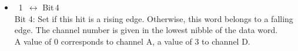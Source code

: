 \begin{description}[style=nextline]
{\begin{itemize}
\begin{align*}
                &\times \texttt{xtdc4\_param\_info.binsize}
            \end{align*}
            \item \indent{}~1~$\leftrightarrow$ Bit\,4\\
            Bit 4: Set if this hit is a rising edge. Otherwise, this word belongs
            to a falling edge.  The channel number is given in the lowest nibble
            of the data word. \\
            A value of 0 corresponds to channel A, a value of 3 to channel D.\par
        \end{itemize}
    }
\end{description}
